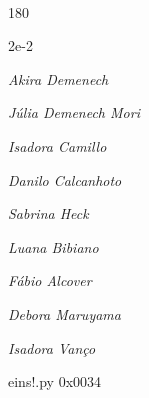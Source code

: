 \documentclass[12pt]{article}
\begin{document}

\pagebreak			

	\ 
	\vfill
	\begin{turn}{180}	
		\begin{minipage}{\textwidth}
		  	\ttfamily %
			\centering
			{\Huge 2e-2}
		  
			\hfill
		  
			

\textit{\small Akira Demenech}

\textit{\small Júlia Demenech Mori}

\textit{\small Isadora Camillo}

\textit{\small Danilo Calcanhoto}

\textit{\small Sabrina Heck}

\textit{\small Luana Bibiano}

\textit{\small Fábio Alcover}

\textit{\small Debora Maruyama}

\textit{\small Isadora Vanço}

\bigskip

eins!.py
0x0034


		\end{minipage}	
	\end{turn}
	\vfill
	\

\pagebreak
\end{document}
